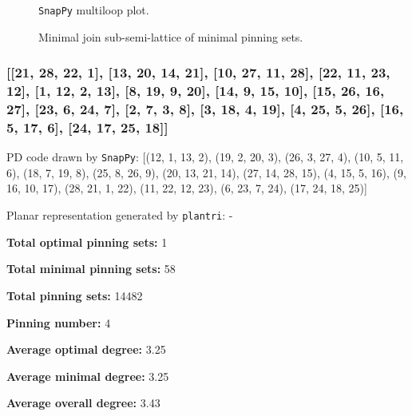 \documentclass{article}%
\begin{document}
\begin{multicols}{2}
\begin{figure}[H]
\centering

\caption{\texttt{SnapPy} multiloop plot.}
\label{fig:tex/img/[[21, 28, 22, 1], [9, 20, 10, 21], [10, 27, 11, 28], [22, 7, 23, 8], [1, 8, 2, 9], [14, 19, 15, 20], [15, 26, 16, 27], [11, 6, 12, 7], [23, 12, 24, 13], [2, 13, 3, 14], [3, 18, 4, 19], [4, 25, 5, 26],.svg}
\end{figure}
\columnbreak

\begin{figure}[H]
\centering
\scalebox{0.8}{}
\caption{Minimal join sub-semi-lattice of minimal pinning sets.}
\label{fig:tex/img/[[21, 28, 22, 1], [9, 20, 10, 21], [10, 27, 11, 28], [22, 7, 23, 8], [1, 8, 2, 9], [14, 19, 15, 20], [15, 26, 16, 27], [11, 6, 12, 7], [23, 12, 24, 13], [2, 13, 3, 14], [3, 18, 4, 19], [4, 25, 5, 26],.pgf}
\end{figure}
\end{multicols}

\newpage

\subsubsection{[[21, 28, 22, 1], [13, 20, 14, 21], [10, 27, 11, 28], [22, 11, 23, 12], [1, 12, 2, 13], [8, 19, 9, 20], [14, 9, 15, 10], [15, 26, 16, 27], [23, 6, 24, 7], [2, 7, 3, 8], [3, 18, 4, 19], [4, 25, 5, 26], [16, 5, 17, 6], [24, 17, 25, 18]]}

{\small\noindent PD code drawn by \texttt{SnapPy}: [(12, 1, 13, 2), (19, 2, 20, 3), (26, 3, 27, 4), (10, 5, 11, 6), (18, 7, 19, 8), (25, 8, 26, 9), (20, 13, 21, 14), (27, 14, 28, 15), (4, 15, 5, 16), (9, 16, 10, 17), (28, 21, 1, 22), (11, 22, 12, 23), (6, 23, 7, 24), (17, 24, 18, 25)]}

{\small\noindent Planar representation generated by \texttt{plantri}: -}

\begin{multicols}{2}
{\normalsize \noindent\textbf{Total optimal pinning sets:} 1

\noindent\textbf{Total minimal pinning sets:} 58

\noindent\textbf{Total pinning sets:} 14482

\noindent\textbf{Pinning number:} 4

}
\columnbreak

{\normalsize \noindent\textbf{Average optimal degree:} 3.25

\noindent\textbf{Average minimal degree:} 3.25

\noindent\textbf{Average overall degree:} 3.43

}
\end{multicols}
\end{document}
